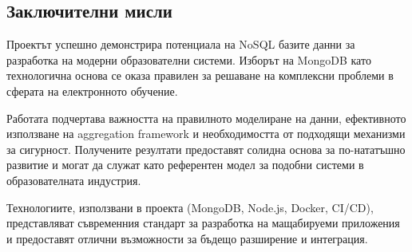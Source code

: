 \subsection{Заключителни мисли}

Проектът успешно демонстрира потенциала на NoSQL базите данни за разработка на модерни образователни системи. Изборът на MongoDB като технологична основа се оказа правилен за решаване на комплексни проблеми в сферата на електронното обучение.

Работата подчертава важността на правилното моделиране на данни, ефективното използване на aggregation framework и необходимостта от подходящи механизми за сигурност. Получените резултати предоставят солидна основа за по-нататъшно развитие и могат да служат като референтен модел за подобни системи в образователната индустрия.

Технологиите, използвани в проекта (MongoDB, Node.js, Docker, CI/CD), представляват съвременния стандарт за разработка на мащабируеми приложения и предоставят отлични възможности за бъдещо разширение и интеграция.
